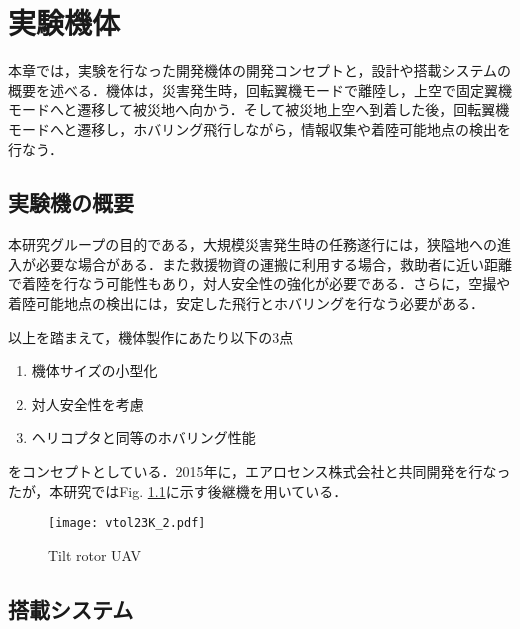 
\chapter{実験機体}
\label{aircraft}

本章では，実験を行なった開発機体の開発コンセプトと，設計や搭載システムの概要を述べる．機体は，災害発生時，回転翼機モードで離陸し，上空で固定翼機モードへと遷移して被災地へ向かう．そして被災地上空へ到着した後，回転翼機モードへと遷移し，ホバリング飛行しながら，情報収集や着陸可能地点の検出を行なう．

\section{実験機の概要}
本研究グループの目的である，大規模災害発生時の任務遂行には，狭隘地への進入が必要な場合がある．また救援物資の運搬に利用する場合，救助者に近い距離で着陸を行なう可能性もあり，対人安全性の強化が必要である．さらに，空撮や着陸可能地点の検出には，安定した飛行とホバリングを行なう必要がある．

以上を踏まえて，機体製作にあたり以下の3点
	\begin{enumerate}
	\item 機体サイズの小型化
	\item 対人安全性を考慮
	\item ヘリコプタと同等のホバリング性能
	\end{enumerate}
をコンセプトとしている．2015年に，エアロセンス株式会社と共同開発を行なったが，本研究ではFig. \ref{fig:vtol23k}に示す後継機を用いている．

\begin{figure}[H]
\centering
\texttt{[image: vtol23K\_2.pdf]}
\caption{Tilt rotor UAV}
\label{fig:vtol23k}
\end{figure}


\section{搭載システム}
